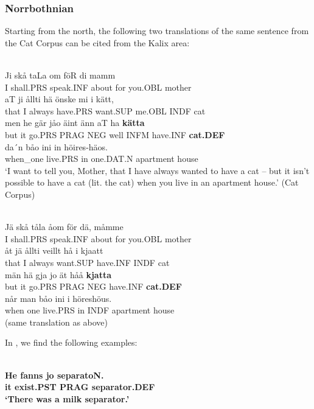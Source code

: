 \subsubsection{Norrbothnian}
 Starting from the north, the following two translations of the same sentence from the Cat Corpus can be cited from the Kalix area:

\ea\label{}
\\
\gll Ji  skå  taLa  om  föR  di  mamm\\
I  shall.PRS  speak.INF  about  for  you.OBL  mother\\
\gll aT  ji  ållti  hä  önske  mi  i  kätt,\\
that  I  always  have.PRS  want.SUP  me.OBL  INDF  cat\\
\gll men  he  gär  jåo  äint  änn  aT  ha  \textbf{kätta}\\
but  it  go.PRS  PRAG  NEG  well  INFM  have.INF  \textbf{cat.DEF}\\
\gll da´n  båo  ini  in  höires-häos.\\
when\_one  live.PRS  in  one.DAT.N  apartment house\\
\glt ‘I want to tell you, Mother, that I have always wanted to have a cat – but it isn’t possible to have a cat (lit. the cat) when you live in an apartment house.’ (Cat Corpus)

\z

\ea\label{}
\\
\gll Jä  skå  tåla  åom  för  dä,  måmme\\
I  shall.PRS  speak.INF  about  for  you.OBL  mother\\
\gll åt  jä  ållti  veillt  hå  i  kjaatt\\
that  I  always  want.SUP  have.INF  INDF  cat  \\
\gll män  hä  gja  jo  ät  håå  \textbf{kjatta}\\
but  it  go.PRS  PRAG  NEG  have.INF  \textbf{cat.DEF}\\
\gll når  man  båo   ini  i  höreshöus.\\
when  one  live.PRS  in  INDF  apartment house\\
\glt (same translation as above)

\z

In \citet{Stenberg1971}, we find the following examples:

\ea\label{}
\\
\gll\bfseries
He  fanns  jo  separatoN.\\
\bfseries
it  exist.PST  PRAG  separator.DEF\\
\glt ‘There was a milk separator.’ 

